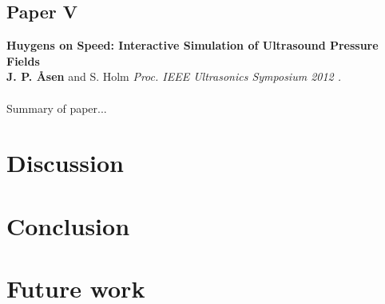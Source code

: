 \subsection{Paper V}
\textbf{Huygens on Speed: Interactive Simulation of Ultrasound Pressure Fields}\\
\textbf{J. P. \AA{}sen} and S. Holm
{\it Proc. IEEE Ultrasonics Symposium 2012 .}\\\\
Summary of paper...

\section{Discussion}

\section{Conclusion}

\section{Future work}

\endinput